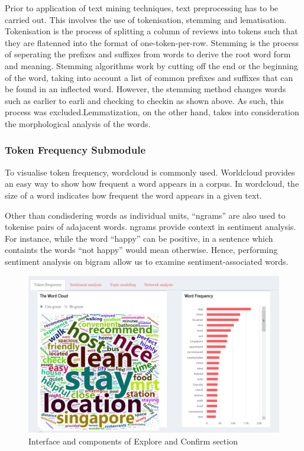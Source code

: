 \documentclass{acm_proc_article-sp}
\begin{document}
Prior to application of text mining techniques, text preprocessing has
to be carried out. This involves the use of tokenisation, stemming and
lematisation. Tokenisation is the process of splitting a column of
reviews into tokens such that they are flatenned into the format of
one-token-per-row. Stemming is the process of seperating the prefixes
and suffixes from words to derive the root word form and meaning.
Stemming algorithms work by cutting off the end or the beginning of the
word, taking into account a list of common prefixes and suffixes that
can be found in an inflected word. However, the stemming method changes
words such as earlier to earli and checking to checkin as shown above.
As such, this process was excluded.Lemmatization, on the other hand,
takes into consideration the morphological analysis of the words.

\hypertarget{token-frequency-submodule}{%
\subsubsection{Token Frequency
Submodule}\label{token-frequency-submodule}}

To visualise token frequency, wordcloud is commonly used. Worldcloud
provides an easy way to show how frequent a word appears in a corpus. In
wordcloud, the size of a word indicates how frequent the word appears in
a given text.

Other than condisdering words as individual units, ``ngrams'' are also
used to tokenise pairs of adajacent words. ngrams provide context in
sentiment analysis. For instance, while the word ``happy'' can be
positive, in a sentence which containts the words ``not happy'' would
mean otherwise. Hence, performing sentiment analysis on bigram allow us
to examine sentiment-associated words.

\begin{figure}[H]

{\centering \includegraphics[width=1\linewidth]{images/tokenfrequency} 

}

\caption{Interface and components of Explore and Confirm section}\label{fig:unnamed-chunk-5}
\end{figure}
\end{document}
